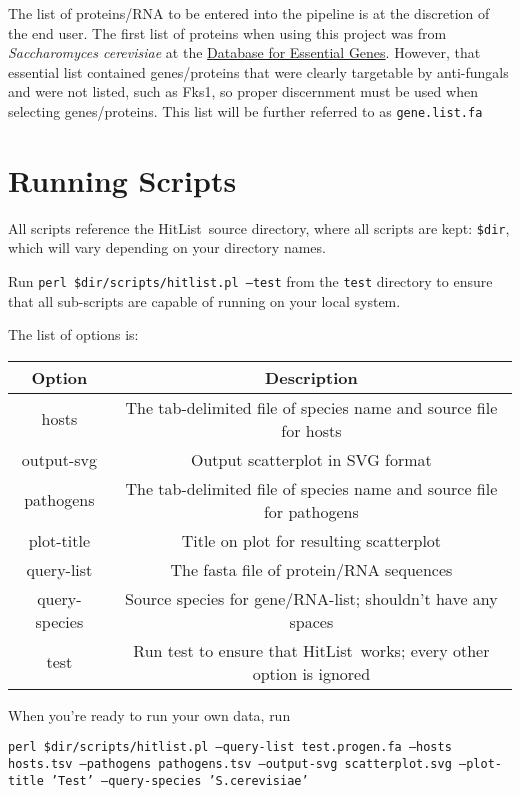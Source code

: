 \documentclass{article}
\newcommand{\pipelineName}{HitList}
\begin{document}
The list of proteins/RNA to be entered into the pipeline is at the discretion of the end user.
The first list of proteins when using this project was from \emph{Saccharomyces cerevisiae} at the \href{http://origin.tubic.org/deg/public/index.php}{Database for Essential Genes}.
However, that essential list contained genes/proteins that were clearly targetable by anti-fungals and were not listed, such as Fks1, so proper discernment must be used when selecting genes/proteins.
This list will be further referred to as \texttt{gene.list.fa}

\section{Running Scripts}

All scripts reference the \pipelineName\ source directory, where all scripts are kept: \texttt{\$dir}, which will vary depending on your directory names.

Run \texttt{perl \$dir/scripts/hitlist.pl --test} from the \texttt{test} directory to ensure that all sub-scripts are capable of running on your local system.

The list of options is:

\begin{table}[htp] \centering
\begin{tabular}{|c|c|} \hline
	\textbf{Option} & \textbf{Description} \\\hline
	hosts				& The tab-delimited file of species name and source file for hosts\\
	output-svg		& Output scatterplot in SVG format\\
	pathogens		& The tab-delimited file of species name and source file for pathogens\\
	plot-title		& Title on plot for resulting scatterplot\\
	query-list		& The fasta file of protein/RNA sequences\\
	query-species	& Source species for gene/RNA-list; shouldn't have any spaces\\
	test				& Run test to ensure that \pipelineName\ works; every other option is ignored\\
\hline \end{tabular}
\end{table} \FloatBarrier
When you're ready to run your own data, run 

\texttt{perl \$dir/scripts/hitlist.pl --query-list test.progen.fa --hosts hosts.tsv --pathogens pathogens.tsv --output-svg scatterplot.svg --plot-title 'Test' --query-species 'S.cerevisiae'}
\end{document}
